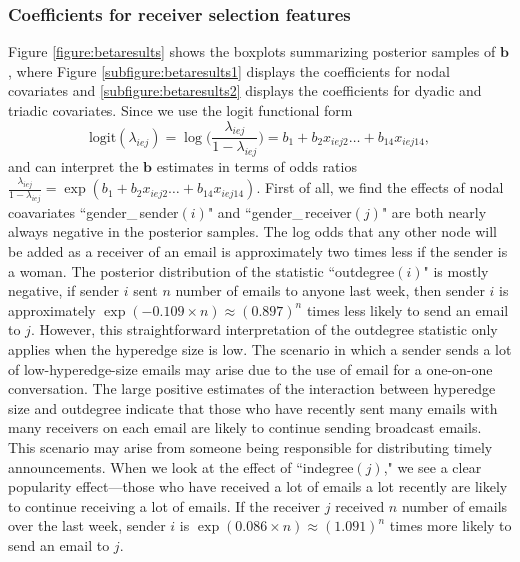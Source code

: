 \documentclass[ba]{imsart}
\numberwithin{equation}{section}
\theoremstyle{plain}
\begin{document}
	\subsubsection{Coefficients for receiver selection features}
	Figure \ref{figure:betaresults} shows the boxplots summarizing posterior samples of $\boldsymbol{b}$, where Figure \ref{subfigure:betaresults1} displays the coefficients for nodal covariates and \ref{subfigure:betaresults2} displays the coefficients for dyadic and triadic covariates. Since we use the logit functional form 
	\begin{equation*}
		\mbox{logit}(\lambda_{iej})=\log\Big(\frac{\lambda_{iej}}{1-\lambda_{iej}}\Big) =b_{1}+b_{2} x_{iej2}\ldots+b_{14}x_{iej14},
	\end{equation*}
	and can interpret the $\boldsymbol{b}$ estimates in terms of odds ratios $\frac{\lambda_{iej}}{1-\lambda_{iej}}=\exp(b_{1}+b_{2} x_{iej2}\ldots+b_{14}x_{iej14})$. First of all, we find the effects of nodal coavariates ``gender\_\,sender$(i)$" and ``gender\_\,receiver$(j)$" are both nearly always negative in the posterior samples. The log odds that any other node will be added as a receiver of an email is approximately two times less if the sender is a woman. The posterior distribution of the statistic ``outdegree$(i)$" is mostly negative, if sender $i$ sent $n$ number of emails to anyone last week, then sender $i$ is approximately $\exp(-0.109\times n)\approx(0.897)^n$ times less likely to send an email to $j$. However, this straightforward interpretation of the outdegree statistic only applies when the hyperedge size is low. The scenario in which a sender sends a lot of low-hyperedge-size emails may arise due to the use of email for a one-on-one conversation. The large positive estimates of the interaction between hyperedge size and outdegree indicate that those who have recently sent many emails with many receivers on each email are likely to continue sending broadcast emails. This scenario may arise from someone being responsible for distributing timely announcements. When we look at the effect of ``indegree$(j)$," we see a clear popularity effect---those who have received a lot of emails a lot recently are likely to continue receiving a lot of emails. If the receiver $j$ received $n$ number of emails over the last week, sender $i$ is $\exp(0.086\times n)\approx(1.091)^n $ times more likely to send an email to $j$. 
		
\end{document}
